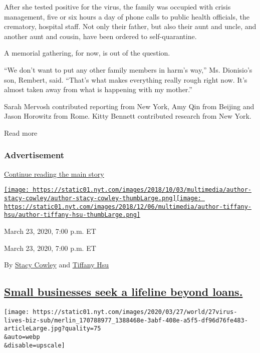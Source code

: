 After she tested positive for the virus, the family was occupied with
crisis management, five or six hours a day of phone calls to public
health officials, the crematory, hospital staff. Not only their father,
but also their aunt and uncle, and another aunt and cousin, have been
ordered to self-quarantine.

A memorial gathering, for now, is out of the question.

``We don't want to put any other family members in harm's way,'' Ms.
Dionisio's son, Rembert, said. ``That's what makes everything really
rough right now. It's almost taken away from what is happening with my
mother.''

Sarah Mervosh contributed reporting from New York, Amy Qin from Beijing
and Jason Horowitz from Rome. Kitty Bennett contributed research from
New York.

Read more

\hypertarget{advertisement-1}{%
\subsubsection{Advertisement}\label{advertisement-1}}

\protect\hyperlink{after-dfp-ad-mid2}{Continue reading the main story}

\href{https://www.nytimes.com/by/stacy-cowley}{\texttt{[image: https://static01.nyt.com/images/2018/10/03/multimedia/author-stacy-cowley/author-stacy-cowley-thumbLarge.png]}}\href{https://www.nytimes.com/by/tiffany-hsu}{\texttt{[image: https://static01.nyt.com/images/2018/12/06/multimedia/author-tiffany-hsu/author-tiffany-hsu-thumbLarge.png]}}

March 23, 2020, 7:00 p.m. ET

March 23, 2020, 7:00 p.m. ET

By \href{https://www.nytimes.com/by/stacy-cowley}{Stacy Cowley} and
\href{https://www.nytimes.com/by/tiffany-hsu}{Tiffany Hsu}

\hypertarget{small-businesses-seek-a-lifeline-beyond-loans}{%
\subsection{\texorpdfstring{\protect\hyperlink{small-businesses-seek-a-lifeline-beyond-loans}{Small
businesses seek a lifeline beyond
loans.}}{Small businesses seek a lifeline beyond loans.}}\label{small-businesses-seek-a-lifeline-beyond-loans}}

\texttt{[image: https://static01.nyt.com/images/2020/03/27/world/27virus-lives-biz-sub/merlin\_170788977\_1388468e-3abf-408e-a5f5-df96d76fe483-articleLarge.jpg?quality=75\\\&auto=webp\\\&disable=upscale]}

